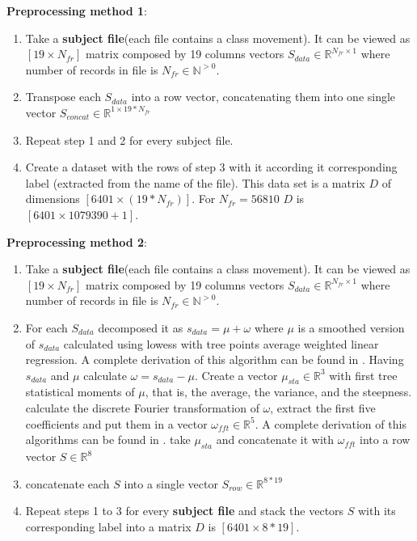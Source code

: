 \textbf{Preprocessing method 1}:
\begin{enumerate}
	\item Take a \textbf{subject file}(each file contains a class movement). It can be viewed as $[19 \times N_{fr}]$ matrix composed by 19 columns vectors $S_{data} \in \mathbb{R}^{N_{fr} \times 1}$  where number of records in file is $N_{fr} \in \mathbb{N}^{>0}$.
	\item Transpose each $S_{data}$ into a row vector, concatenating them into one single vector $S_{concat} \in  \mathbb{R}^{1 \times 19*N_{fr} }$
	\item Repeat step 1 and 2 for every subject file.
	\item Create a dataset with the rows of step 3 with it according it corresponding label (extracted from the name of the file). This data set is a matrix $D$ of dimensions $[6401 \times (19*N_{fr})]$. For $N_{fr}=56810$ $D$ is $[6401 \times 1079390+1]$.
\end{enumerate}

\textbf{Preprocessing method 2}:
\begin{enumerate}
	\item Take a \textbf{subject file}(each file contains a class movement). It can be viewed as $[19 \times N_{fr}]$ matrix composed by 19 columns vectors $S_{data} \in \mathbb{R}^{N_{fr} \times 1}$  where number of records in file is $N_{fr} \in \mathbb{N}^{>0}$.
	\item For each $S_{data}$ decomposed it as $s_{data}=\mu+\omega$ where $\mu$ is a smoothed version of $s_{data}$ calculated using lowess with tree points average weighted linear regression. A complete derivation of this algorithm can be found in \cite{cleveland1979robust}. Having $s_{data}$ and $\mu$ calculate $\omega =s_{data}-\mu$. Create a vector $\mu_{sta} \in \mathbb{R}^{3}$ with first tree statistical moments of $\mu$, that is, the average, the variance, and the steepness. calculate the discrete Fourier transformation of $\omega$, extract the first five coefficients and put them in a vector $\omega_{fft} \in \mathbb{R}^{5}$. A complete derivation of this algorithms can be found in \cite{oraintara2002integer}.
	take $\mu_{sta}$ and concatenate it with $\omega_{fft}$ into a row vector $S \in \mathbb{R}^{8}$
	\item concatenate each $S$ into a single vector $S_{row} \in \mathbb{R}^{8*19}$
	\item Repeat steps 1 to 3 for every \textbf{subject file} and stack the vectors $S$ with its corresponding label into a matrix $D$ is $[6401 \times 8*19]$.
\end{enumerate}

